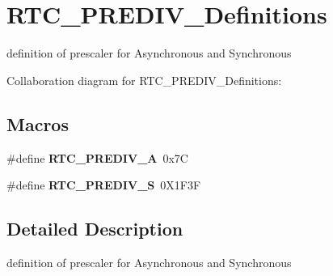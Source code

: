 \hypertarget{group___r_t_c___p_r_e_d_i_v___definitions}{}\section{R\+T\+C\+\_\+\+P\+R\+E\+D\+I\+V\+\_\+\+Definitions}
\label{group___r_t_c___p_r_e_d_i_v___definitions}


definition of prescaler for Asynchronous and Synchronous  


Collaboration diagram for R\+T\+C\+\_\+\+P\+R\+E\+D\+I\+V\+\_\+\+Definitions\+:
\subsection*{Macros}
\begin{DoxyCompactItemize}
\item 
\mbox{\label{group___r_t_c___p_r_e_d_i_v___definitions_ga7d28a18fc36cff684ad43ffd31ca45fc}} 
\#define {\bfseries R\+T\+C\+\_\+\+P\+R\+E\+D\+I\+V\+\_\+A}~0x7C
\item 
\mbox{\label{group___r_t_c___p_r_e_d_i_v___definitions_ga3578b56bdfe76014a3af7e276fe6a6e4}} 
\#define {\bfseries R\+T\+C\+\_\+\+P\+R\+E\+D\+I\+V\+\_\+S}~0\+X1\+F3F
\end{DoxyCompactItemize}


\subsection{Detailed Description}
definition of prescaler for Asynchronous and Synchronous 

